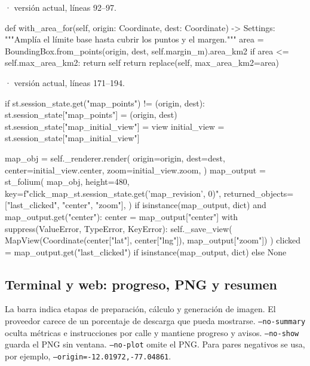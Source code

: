 \documentclass[11pt,a4paper]{article}
\begin{document}
\smallskip
{\footnotesize\texttt{} · versión actual, líneas 92--97.}\par
\begin{Codigo}[firstnumber=92]
    def with_area_for(self, origin: Coordinate, dest: Coordinate) -> Settings:
        """Amplía el límite base hasta cubrir los puntos y el margen."""
        area = BoundingBox.from_points(origin, dest, self.margin_m).area_km2
        if area <= self.max_area_km2:
            return self
        return replace(self, max_area_km2=area)
\end{Codigo}

\smallskip
{\footnotesize\texttt{} · versión actual, líneas 171--194.}\par
\begin{Codigo}[firstnumber=171]
        if st.session_state.get("map_points") != (origin, dest):
            st.session_state["map_points"] = (origin, dest)
            st.session_state["map_initial_view"] = view
        initial_view = st.session_state["map_initial_view"]

        map_obj = self._renderer.render(
            origin=origin,
            dest=dest,
            center=initial_view.center,
            zoom=initial_view.zoom,
        )
        map_output = st_folium(
            map_obj,
            height=480,
            key=f"click_map_{st.session_state.get('map_revision', 0)}",
            returned_objects=["last_clicked", "center", "zoom"],
        )
        if isinstance(map_output, dict) and map_output.get("center"):
            center = map_output["center"]
            with suppress(ValueError, TypeError, KeyError):
                self._save_view(
                    MapView(Coordinate(center["lat"], center["lng"]), map_output["zoom"])
                )
        clicked = map_output.get("last_clicked") if isinstance(map_output, dict) else None
\end{Codigo}

\subsection{Terminal y web: progreso, PNG y resumen}
La barra indica etapas de preparación, cálculo y generación de imagen. El proveedor carece de un porcentaje de descarga que pueda mostrarse. \texttt{--no-summary} oculta métricas e instrucciones por calle y mantiene progreso y avisos. \texttt{--no-show} guarda el PNG sin ventana. \texttt{--no-plot} omite el PNG. Para pares negativos se usa, por ejemplo, \texttt{--origin=-12.01972,-77.04861}.
\end{document}
